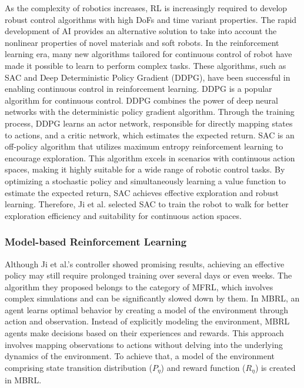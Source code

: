 As the complexity of robotics increases, \ac{RL} is increasingly required to develop robust control algorithms with high \ac{DoF}s and time variant properties\cite{zhangEffectiveSoftRobot2017}. The rapid development of AI provides an alternative solution to take into account the nonlinear properties of novel materials and soft robots\cite{tangModelbasedOnlineLearning2021}. In the reinforcement learning era, many new algorithms tailored for continuous control of robot have made it possible to learn to perform complex tasks. These algorithms, such as \ac{SAC}\cite{haarnojaSoftActorCriticOffPolicy2018} and Deep Deterministic Policy Gradient (DDPG)\cite{silverDeterministicPolicyGradient2014}, have been successful in enabling continuous control in reinforcement learning\cite{haarnojaLearningWalkDeep2019, pengSimtoRealTransferRobotic2018}. DDPG is a popular algorithm for continuous control. DDPG combines the power of deep neural networks with the deterministic policy gradient algorithm. Through the training process, DDPG learns an actor network, responsible for directly mapping states to actions, and a critic network, which estimates the expected return\cite{silverDeterministicPolicyGradient2014}. SAC is an off-policy algorithm that utilizes maximum entropy reinforcement learning to encourage exploration\cite{haarnojaSoftActorCriticOffPolicy2018}. This algorithm excels in scenarios with continuous action spaces\cite{haarnojaLearningWalkDeep2019}, making it highly suitable for a wide range of robotic control tasks. By optimizing a stochastic policy and simultaneously learning a value function to estimate the expected return, SAC achieves effective exploration and robust learning\cite{haarnojaLearningWalkDeep2019, pengSimtoRealTransferRobotic2018}. Therefore, Ji et al. \cite{jiSynthesizingOptimalGait2022} selected \ac{SAC} to train the robot to walk for better exploration efficiency and suitability for continuous action spaces.

\subsubsection{Model-based Reinforcement Learning}
Although Ji et al.\cite{jiSynthesizingOptimalGait2022}'s controller showed promising results, achieving an effective policy may still require prolonged training over several days or even weeks. The algorithm they proposed belongs to the category of \ac{MFRL}, which involves complex simulations and can be significantly slowed down by them. In \ac{MBRL}, an agent learns optimal behavior by creating a model of the environment through action and observation. Instead of explicitly modeling the environment, MBRL agents make decisions based on their experiences and rewards. This approach involves mapping observations to actions without delving into the underlying dynamics of the environment. To achieve that, a model of the environment comprising state transition distribution ($P_\eta$) and reward function ($R_\eta$) is created in MBRL.


